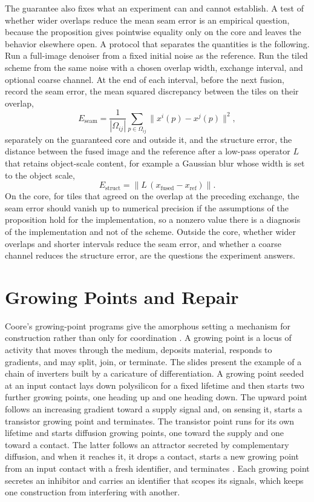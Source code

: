 \documentclass[11pt]{article}
\theoremstyle{definition}
\theoremstyle{plain}
\theoremstyle{remark}
\begin{document}
The guarantee also fixes what an experiment can and cannot establish. A test of whether wider overlaps reduce the mean seam error is an empirical question, because the proposition gives pointwise equality only on the core and leaves the behavior elsewhere open. A protocol that separates the quantities is the following. Run a full-image denoiser from a fixed initial noise as the reference. Run the tiled scheme from the same noise with a chosen overlap width, exchange interval, and optional coarse channel. At the end of each interval, before the next fusion, record the seam error, the mean squared discrepancy between the tiles on their overlap,
\[
E_{\text{seam}}=\frac{1}{|\Omega_{ij}|}\sum_{p\in\Omega_{ij}}\bigl\|x^i(p)-x^j(p)\bigr\|^2,
\]
separately on the guaranteed core and outside it, and the structure error, the distance between the fused image and the reference after a low-pass operator $L$ that retains object-scale content, for example a Gaussian blur whose width is set to the object scale,
\[
E_{\text{struct}}=\bigl\|L\,(x_{\text{fused}}-x_{\text{ref}})\bigr\|.
\]
On the core, for tiles that agreed on the overlap at the preceding exchange, the seam error should vanish up to numerical precision if the assumptions of the proposition hold for the implementation, so a nonzero value there is a diagnosis of the implementation and not of the scheme. Outside the core, whether wider overlaps and shorter intervals reduce the seam error, and whether a coarse channel reduces the structure error, are the questions the experiment answers.

\section{Growing Points and Repair}\label{sec:repair}

Coore's growing-point programs give the amorphous setting a mechanism for construction rather than only for coordination \cite{coore1999,darpa1998}. A growing point is a locus of activity that moves through the medium, deposits material, responds to gradients, and may split, join, or terminate. The slides present the example of a chain of inverters built by a caricature of differentiation. A growing point seeded at an input contact lays down polysilicon for a fixed lifetime and then starts two further growing points, one heading up and one heading down. The upward point follows an increasing gradient toward a supply signal and, on sensing it, starts a transistor growing point and terminates. The transistor point runs for its own lifetime and starts diffusion growing points, one toward the supply and one toward a contact. The latter follows an attractor secreted by complementary diffusion, and when it reaches it, it drops a contact, starts a new growing point from an input contact with a fresh identifier, and terminates \cite{darpa1998}. Each growing point secretes an inhibitor and carries an identifier that scopes its signals, which keeps one construction from interfering with another.
\end{document}
